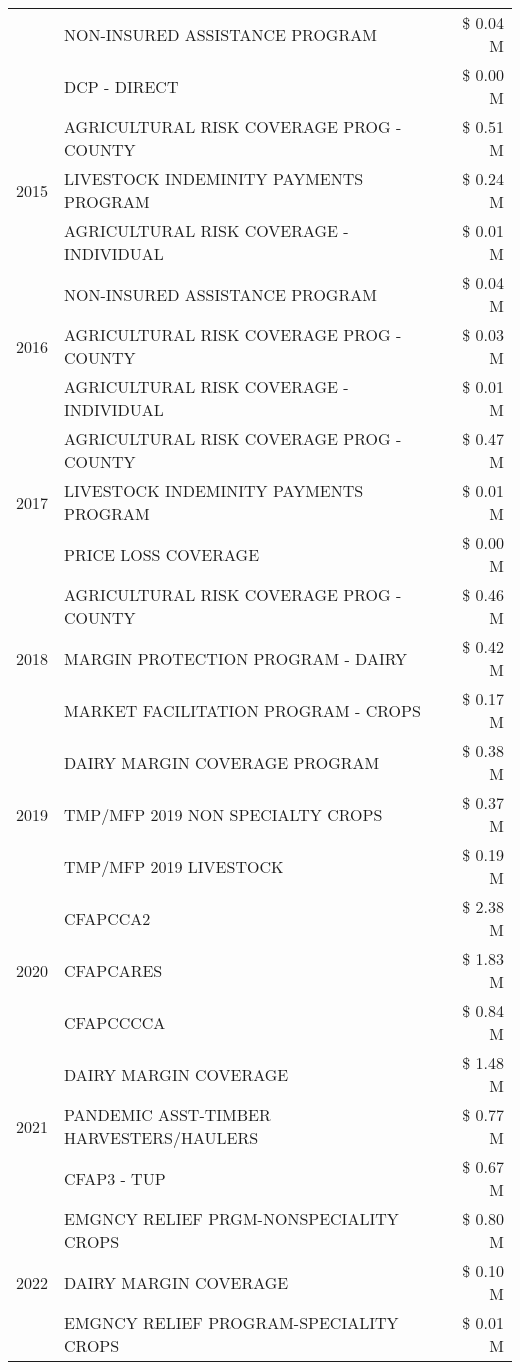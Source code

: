 \begin{tabular}{llr}
 & NON-INSURED ASSISTANCE PROGRAM & \$ 0.04 M \\
 & DCP - DIRECT & \$ 0.00 M \\
\cline{1-3}
\multirow[t]{3}{*}{2015} & AGRICULTURAL RISK COVERAGE PROG - COUNTY & \$ 0.51 M \\
 & LIVESTOCK INDEMINITY PAYMENTS PROGRAM & \$ 0.24 M \\
 & AGRICULTURAL RISK COVERAGE - INDIVIDUAL & \$ 0.01 M \\
\cline{1-3}
\multirow[t]{3}{*}{2016} & NON-INSURED ASSISTANCE PROGRAM & \$ 0.04 M \\
 & AGRICULTURAL RISK COVERAGE PROG - COUNTY & \$ 0.03 M \\
 & AGRICULTURAL RISK COVERAGE - INDIVIDUAL & \$ 0.01 M \\
\cline{1-3}
\multirow[t]{3}{*}{2017} & AGRICULTURAL RISK COVERAGE PROG - COUNTY & \$ 0.47 M \\
 & LIVESTOCK INDEMINITY PAYMENTS PROGRAM & \$ 0.01 M \\
 & PRICE LOSS COVERAGE & \$ 0.00 M \\
\cline{1-3}
\multirow[t]{3}{*}{2018} & AGRICULTURAL RISK COVERAGE PROG - COUNTY & \$ 0.46 M \\
 & MARGIN PROTECTION PROGRAM - DAIRY & \$ 0.42 M \\
 & MARKET FACILITATION PROGRAM - CROPS & \$ 0.17 M \\
\cline{1-3}
\multirow[t]{3}{*}{2019} & DAIRY MARGIN COVERAGE PROGRAM & \$ 0.38 M \\
 & TMP/MFP 2019 NON SPECIALTY CROPS & \$ 0.37 M \\
 & TMP/MFP 2019 LIVESTOCK & \$ 0.19 M \\
\cline{1-3}
\multirow[t]{3}{*}{2020} & CFAPCCA2 & \$ 2.38 M \\
 & CFAPCARES & \$ 1.83 M \\
 & CFAPCCCCA & \$ 0.84 M \\
\cline{1-3}
\multirow[t]{3}{*}{2021} & DAIRY MARGIN COVERAGE & \$ 1.48 M \\
 & PANDEMIC ASST-TIMBER HARVESTERS/HAULERS & \$ 0.77 M \\
 & CFAP3 - TUP & \$ 0.67 M \\
\cline{1-3}
\multirow[t]{3}{*}{2022} & EMGNCY RELIEF PRGM-NONSPECIALITY CROPS & \$ 0.80 M \\
 & DAIRY MARGIN COVERAGE & \$ 0.10 M \\
 & EMGNCY RELIEF PROGRAM-SPECIALITY CROPS & \$ 0.01 M \\
\cline{1-3}
\bottomrule
\end{tabular}
